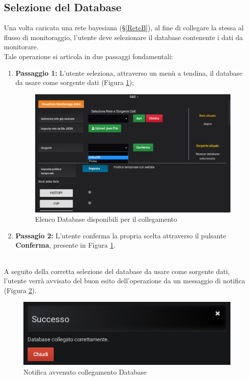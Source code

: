 \subsection{Selezione del Database}\label{SelectDB}

Una volta caricata una rete bayesiana (§\ref{ReteB}), al fine di collegare la stessa al flusso di monitoraggio, l'utente deve selezionare il database contenente i dati da monitorare.\\
Tale operazione si articola in due passaggi fondamentali:
\begin{enumerate}
	\item \textbf{Passaggio 1:} L'utente seleziona, attraverso un menù a tendina, il database da usare come sorgente dati (Figura \ref{Sorgenti});
	\begin{figure}[H]
	\begin{center}
		\includegraphics[scale=0.68]{./images/Sorgenti.png}
		 \caption{Elenco Database disponibili per il collegamento}	
		 \label{Sorgenti}
	\end{center}
	\end{figure}
	\item \textbf{Passagio 2:} L'utente conferma la propria scelta attraverso il pulsante \textbf{Conferma}, presente in Figura \ref{Sorgenti}.
\end{enumerate}
~\\
A seguito della corretta selezione del database da usare come sorgente dati, l'utente verrà avvisato del buon esito dell'operazione da un messaggio di notifica (Figura \ref{NotificaSorgente}). 

\begin{figure}[H]
	\begin{center}
		\includegraphics[scale=0.6]{./images/NotificaSorgente.png}
		 \caption{Notifica avvenuto collegamento Database}	
		 \label{NotificaSorgente}
	\end{center}
\end{figure}